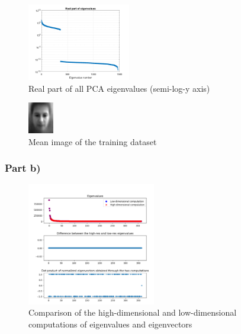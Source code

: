 \documentclass[10pt,technote]{IEEEtran}
\begin{document}
\begin{figure}
    \centering
    \includegraphics[width=0.4\textwidth]{../results/ex1a/eigenvalues.png}
    \caption{Real part of all PCA eigenvalues (semi-log-y axis)}
    \label{fig:eigvals1}
\end{figure}

\begin{figure}
    \centering
    \includegraphics[width=0.1\textwidth]{../results/ex1a/mean_image.png}
    \caption{Mean image of the training dataset}
    \label{fig:mean_im1}
\end{figure}

\subsubsection{Part b)}
\begin{figure}
    \centering
    \includegraphics[width=0.5\textwidth]{../results/ex1b/DIfference_eig.png}
    \caption{Comparison of the high-dimensional and low-dimensional computations of eigenvalues and eigenvectors}
    \label{fig:eig_diff1}
\end{figure}




%
%
\end{document}

